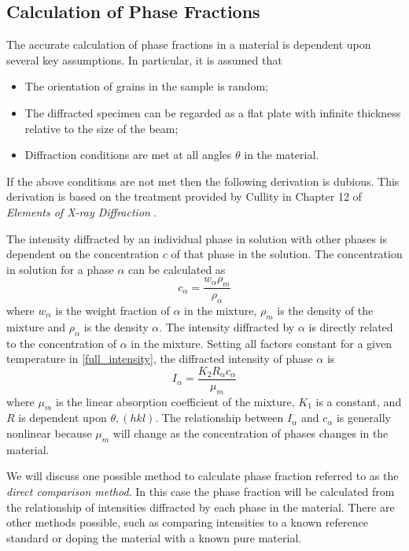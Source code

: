 \subsection{Calculation of Phase Fractions}
The accurate calculation of phase fractions in a material is dependent upon several key assumptions. In particular, it is assumed that
\begin{itemize}
	\item The orientation of grains in the sample is random;
	\item The diffracted specimen can be regarded as a flat plate with infinite thickness relative to the size of the beam;
	\item Diffraction conditions are met at all angles $\theta$ in the material.
\end{itemize}
If the above conditions are not met then the following derivation is dubious. This derivation is based on the treatment provided by Cullity in Chapter 12 of \textit{Elements of X-ray Diffraction} \cite{Cullity}. 

The intensity diffracted by an individual phase in solution with other phases is dependent on the concentration $c$ of that phase in the solution. The concentration in solution for a phase $\alpha$ can be calculated as 
\begin{equation}
	c_\alpha = \frac{w_\alpha \rho_m}{\rho_\alpha}
	\label{concentration}
\end{equation}
where $w_\alpha$ is the weight fraction of $\alpha$ in the mixture, $\rho_m$ is the density of the mixture and $\rho_\alpha$ is the density $\alpha$. The intensity diffracted by $\alpha$ is directly related to the concentration of $\alpha$ in the mixture. Setting all factors constant for a given temperature in \ref{full_intensity}, the diffracted intensity of phase $\alpha$ is
\begin{equation}
	I_\alpha = \frac{K_2 R_\alpha c_\alpha}{\mu_m}
	\label{intensity_alpha}
\end{equation}
where $\mu_m$ is the linear absorption coefficient of the mixture, $K_1$ is a constant, and $R$ is dependent upon $\theta, (hkl)$. The relationship between $I_\alpha$ and $c_\alpha$ is generally nonlinear because $\mu_m$ will change as the concentration of phases changes in the material. 

We will discuss one possible method to calculate phase fraction referred to as the \textit{direct comparison method}. In this case the phase fraction will be calculated from the relationship of intensities diffracted by each phase in the material. There are other methods possible, such as comparing intensities to a known reference standard or doping the material with a known pure material.

